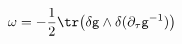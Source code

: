 \begin{equation}
\label{symplectic}
\omega = -\frac{1}{2} \tr \big( \delta \mathsf{g} \wedge \delta (
\partial_{\tau}\mathsf{g}^{-1}) \big)
\end{equation}

